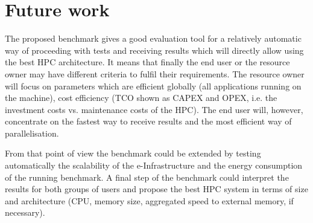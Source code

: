\section{Future work}
The proposed benchmark gives a good evaluation tool for a relatively automatic way of proceeding with tests and receiving results which will directly allow using the best HPC architecture.  It means that finally the end user or the resource owner may have different criteria to fulfil their requirements. The resource owner will focus on parameters which are efficient globally (all applications running on the machine), cost efficiency (TCO shown as CAPEX and OPEX, i.e. the investment costs vs. maintenance costs of the HPC). The end user will, however, concentrate on the fastest way to receive results and the most efficient way of parallelisation.

From that point of view the benchmark could be extended by testing automatically
the scalability of the e-Infrastructure and the energy consumption of the running benchmark. A final step of the benchmark could interpret the results for both groups of users and propose the best HPC system in terms of size and architecture (CPU, memory size, aggregated speed to external memory, if necessary).